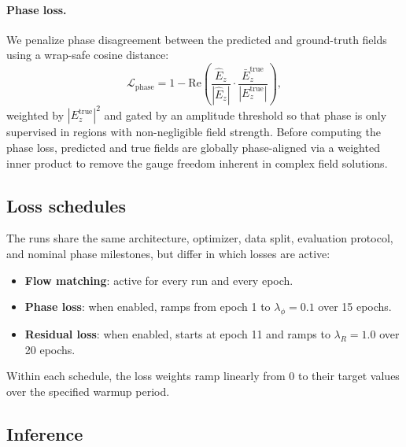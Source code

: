 \documentclass[%
 reprint,
 amsmath,amssymb,
 aps,
floatfix,
]{revtex4-2}
\begin{document}
\paragraph{Phase loss.}
We penalize phase disagreement between the predicted and ground-truth fields using a wrap-safe cosine distance:
\begin{equation}
    \mathcal{L}_\text{phase} = 1 - \mathrm{Re}\!\left(\frac{\hat{E}_z}{|\hat{E}_z|} \cdot
    \frac{\bar{E}_z^\text{true}}{|E_z^\text{true}|}\right),
    \label{eq:phase_loss}
\end{equation}
weighted by $|E_z^\text{true}|^2$ and gated by an amplitude threshold so that phase is only supervised in regions with non-negligible field strength. Before computing the phase loss, predicted and true fields are globally phase-aligned via a weighted inner product to remove the gauge freedom inherent in complex field solutions.

\subsection{\label{sec:curriculum}Loss schedules}

The runs share the same architecture, optimizer, data split, evaluation protocol, and nominal phase milestones, but differ in which losses are active:
\begin{itemize}
    \item \textbf{Flow matching}: active for every run and every epoch.
    \item \textbf{Phase loss}: when enabled, ramps from epoch 1 to $\lambda_\phi=0.1$ over 15 epochs.
    \item \textbf{Residual loss}: when enabled, starts at epoch 11 and ramps to $\lambda_R=1.0$ over 20 epochs.
\end{itemize}

Within each schedule, the loss weights ramp linearly from 0 to their target values over the specified warmup period.

\subsection{Inference}
\end{document}
